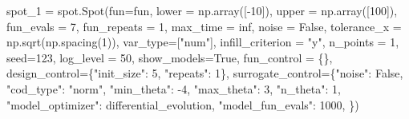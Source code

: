 \documentclass[
  letterpaper,
  DIV=11,
  numbers=noendperiod]{scrreprt}
\newenvironment{Shaded}{\begin{snugshade}}{\end{snugshade}}
\newcommand{\DecValTok}[1]{\textcolor[rgb]{0.68,0.00,0.00}{#1}}
\newcommand{\NormalTok}[1]{\textcolor[rgb]{0.00,0.23,0.31}{#1}}
\newcommand{\OperatorTok}[1]{\textcolor[rgb]{0.37,0.37,0.37}{#1}}
\newcommand{\StringTok}[1]{\textcolor[rgb]{0.13,0.47,0.30}{#1}}
\newcommand{\VariableTok}[1]{\textcolor[rgb]{0.07,0.07,0.07}{#1}}
\begin{document}
\begin{Shaded}
\begin{Highlighting}[]
\NormalTok{spot\_1 }\OperatorTok{=}\NormalTok{ spot.Spot(fun}\OperatorTok{=}\NormalTok{fun,}
\NormalTok{                   lower }\OperatorTok{=}\NormalTok{ np.array([}\OperatorTok{{-}}\DecValTok{10}\NormalTok{]),}
\NormalTok{                   upper }\OperatorTok{=}\NormalTok{ np.array([}\DecValTok{100}\NormalTok{]),}
\NormalTok{                   fun\_evals }\OperatorTok{=} \DecValTok{7}\NormalTok{,}
\NormalTok{                   fun\_repeats }\OperatorTok{=} \DecValTok{1}\NormalTok{,}
\NormalTok{                   max\_time }\OperatorTok{=}\NormalTok{ inf,}
\NormalTok{                   noise }\OperatorTok{=} \VariableTok{False}\NormalTok{,}
\NormalTok{                   tolerance\_x }\OperatorTok{=}\NormalTok{ np.sqrt(np.spacing(}\DecValTok{1}\NormalTok{)),}
\NormalTok{                   var\_type}\OperatorTok{=}\NormalTok{[}\StringTok{"num"}\NormalTok{],}
\NormalTok{                   infill\_criterion }\OperatorTok{=} \StringTok{"y"}\NormalTok{,}
\NormalTok{                   n\_points }\OperatorTok{=} \DecValTok{1}\NormalTok{,}
\NormalTok{                   seed}\OperatorTok{=}\DecValTok{123}\NormalTok{,}
\NormalTok{                   log\_level }\OperatorTok{=} \DecValTok{50}\NormalTok{,}
\NormalTok{                   show\_models}\OperatorTok{=}\VariableTok{True}\NormalTok{,}
\NormalTok{                   fun\_control }\OperatorTok{=}\NormalTok{ \{\},}
\NormalTok{                   design\_control}\OperatorTok{=}\NormalTok{\{}\StringTok{"init\_size"}\NormalTok{: }\DecValTok{5}\NormalTok{,}
                                   \StringTok{"repeats"}\NormalTok{: }\DecValTok{1}\NormalTok{\},}
\NormalTok{                   surrogate\_control}\OperatorTok{=}\NormalTok{\{}\StringTok{"noise"}\NormalTok{: }\VariableTok{False}\NormalTok{,}
                                      \StringTok{"cod\_type"}\NormalTok{: }\StringTok{"norm"}\NormalTok{,}
                                      \StringTok{"min\_theta"}\NormalTok{: }\OperatorTok{{-}}\DecValTok{4}\NormalTok{,}
                                      \StringTok{"max\_theta"}\NormalTok{: }\DecValTok{3}\NormalTok{,}
                                      \StringTok{"n\_theta"}\NormalTok{: }\DecValTok{1}\NormalTok{,}
                                      \StringTok{"model\_optimizer"}\NormalTok{: differential\_evolution,}
                                      \StringTok{"model\_fun\_evals"}\NormalTok{: }\DecValTok{1000}\NormalTok{,}
\NormalTok{                                      \})}
\end{Highlighting}
\end{Shaded}
\end{document}
